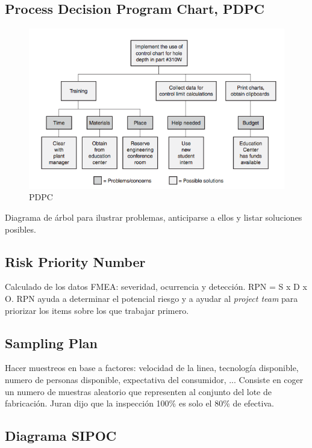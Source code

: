 \documentclass[]{article}
\begin{document}
\subsection{Process Decision Program Chart, PDPC}

\begin{figure}[ht!]
	\centering
	\includegraphics[width=120mm]{imagenes/PDPC.png}
	\caption{PDPC}
	\label{fig:PDPC}
\end{figure}

Diagrama de árbol para ilustrar problemas, anticiparse a ellos y listar soluciones posibles.

\subsection{Risk Priority Number}

Calculado de los datos FMEA: severidad, ocurrencia y detección. RPN = S x D x O. RPN ayuda a determinar el potencial riesgo y a ayudar al \textit{project team} para priorizar los items sobre los que trabajar primero.

\subsection{Sampling Plan}

Hacer muestreos en base a factores: velocidad de la linea, tecnología disponible, numero de personas disponible, expectativa del consumidor, ... 
Consiste en coger un numero de muestras aleatorio que representen al conjunto del lote de fabricación.
Juran dijo que la inspección 100\% es solo el 80\% de efectiva.

\subsection{Diagrama SIPOC}
\end{document}
